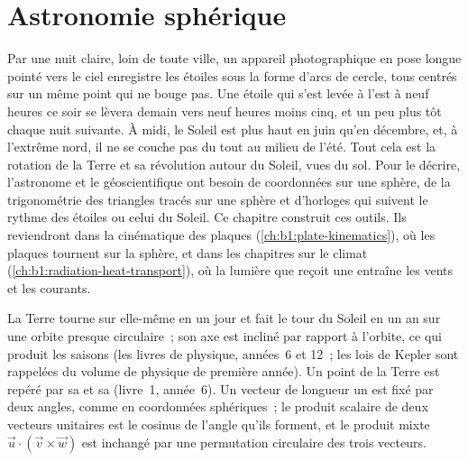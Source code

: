\chapter{Astronomie sphérique}\label{ch:b1:spherical-astronomy}

Par une nuit claire, loin de toute ville, un appareil photographique en pose
longue pointé vers le ciel enregistre les étoiles sous la forme d'arcs de
cercle, tous centrés sur un même point qui ne bouge pas. Une étoile qui s'est
levée à l'est à neuf heures ce soir se lèvera demain vers neuf heures moins
cinq, et un peu plus tôt chaque nuit suivante. À midi, le Soleil est plus haut
en juin qu'en décembre, et, à l'extrême nord, il ne se couche pas du tout au
milieu de l'été. Tout cela est la rotation de la Terre et sa révolution
autour du Soleil, vues du sol. Pour le décrire, l'astronome et le
géoscientifique ont besoin de coordonnées sur une sphère, de la
trigonométrie des triangles tracés sur une sphère et d'horloges qui suivent
le rythme des étoiles ou celui du Soleil. Ce chapitre construit ces outils.
Ils reviendront dans la cinématique des plaques
(\cref{ch:b1:plate-kinematics}), où les plaques tournent sur la sphère, et
dans les chapitres sur le climat (\cref{ch:b1:radiation-heat-transport}), où
la lumière que reçoit une  entraîne les vents et les courants.

\begin{recall}
La Terre tourne sur elle-même en un jour et fait le tour du Soleil en un an
sur une orbite presque circulaire~; son axe est incliné par rapport à
l'orbite, ce qui produit les saisons (les livres de physique, années~6 et 12~;
les lois de Kepler sont rappelées du volume de physique de première année).
Un point de la Terre est repéré par sa  et sa  (livre~1,
année~6). Un vecteur de longueur un est fixé par deux angles, comme en
coordonnées sphériques~; le produit scalaire de deux vecteurs unitaires est le
cosinus de l'angle qu'ils forment, et le produit mixte
$\vec u\cdot(\vec v\times\vec w)$ est inchangé par une permutation
circulaire des trois vecteurs.
\end{recall}

